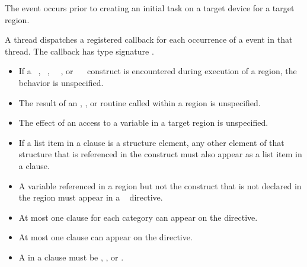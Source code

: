 
\events
{}

The  event occurs prior to creating an initial task on a target device for a target
region.

\tools
{}

A thread dispatches a registered 
callback for each occurrence of a  event
in that thread. The callback has type signature
.

\restrictions
\begin{itemize}
\item If a ~,
~, ~~, or
~~ construct is encountered during
execution of a  region, the behavior is unspecified.

\item The result of an ,
, or 
routine called within a  region is unspecified.

\item The effect of an access to a  variable in a target region is
unspecified.

\item If a list item in a  clause is a structure element, any other
element of that structure that is referenced in the  construct
must also appear as a list item in a  clause.

\item A variable referenced in a  region but not the  construct that is not
declared in the  region must appear in a ~ directive.

\item At most one  clause for each category can appear on the directive.

\item At most one  clause can appear on the directive.

\item A  in a  clause must be , ,  or .


\end{itemize}
